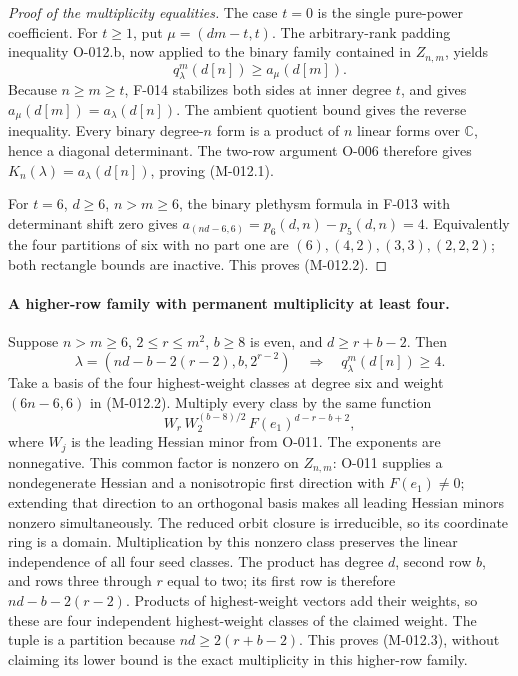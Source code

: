 \begin{proof}[Proof of the multiplicity equalities]
The case \(t=0\) is the single pure-power coefficient.
For \(t\geq1\), put \(\mu=(dm-t,t)\).
The arbitrary-rank padding inequality O-012.b, now applied
to the binary family contained in \(Z_{n,m}\), yields
\[
                  q^m_\lambda(d[n])\geq a_\mu(d[m]).
\]
Because \(n\geq m\geq t\), F-014 stabilizes both sides
at inner degree \(t\), and gives
\(a_\mu(d[m])=a_\lambda(d[n])\). The ambient quotient
bound gives the reverse inequality. Every binary degree-\(n\)
form is a product of \(n\) linear forms over \(\mathbb C\),
hence a diagonal determinant. The two-row argument O-006
therefore gives \(K_n(\lambda)=a_\lambda(d[n])\), proving
(M-012.1).

For \(t=6\), \(d\geq6\), \(n>m\geq6\), the binary
plethysm formula in F-013 with determinant shift zero gives
\(a_{(nd-6,6)}=p_6(d,n)-p_5(d,n)=4\).
Equivalently the four partitions of six with no part one
are \((6),(4,2),(3,3),(2,2,2)\); both rectangle bounds
are inactive. This proves (M-012.2).
\end{proof}

\paragraph{A higher-row family with permanent multiplicity at least four.}
Suppose \(n>m\geq6\), \(2\leq r\leq m^2\), \(b\geq8\)
is even, and \(d\geq r+b-2\). Then
\[
 \lambda=(nd-b-2(r-2),b,2^{r-2})
 \quad\Longrightarrow\quad q^m_\lambda(d[n])\geq4.    \tag{M-012.3}
\]
Take a basis of the four highest-weight classes at degree
six and weight \((6n-6,6)\) in (M-012.2). Multiply every
class by the same function
\[
       W_r\, W_2^{(b-8)/2}\, F(e_1)^{d-r-b+2},
\]
where \(W_j\) is the leading Hessian minor from O-011.
The exponents are nonnegative. This common factor is nonzero
on \(Z_{n,m}\): O-011 supplies a nondegenerate Hessian
and a nonisotropic first direction with \(F(e_1)\ne0\);
extending that direction to an orthogonal basis makes all
leading Hessian minors nonzero simultaneously. The reduced
orbit closure is irreducible, so its coordinate ring is a
domain. Multiplication by this nonzero class preserves the
linear independence of all four seed classes.
The product has degree \(d\), second row \(b\), and
rows three through \(r\) equal to two; its first row is
therefore \(nd-b-2(r-2)\). Products of highest-weight
vectors add their weights, so these are four independent
highest-weight classes of the claimed weight. The tuple is
a partition because \(nd\geq2(r+b-2)\).
This proves (M-012.3), without claiming its lower bound is
the exact multiplicity in this higher-row family.

